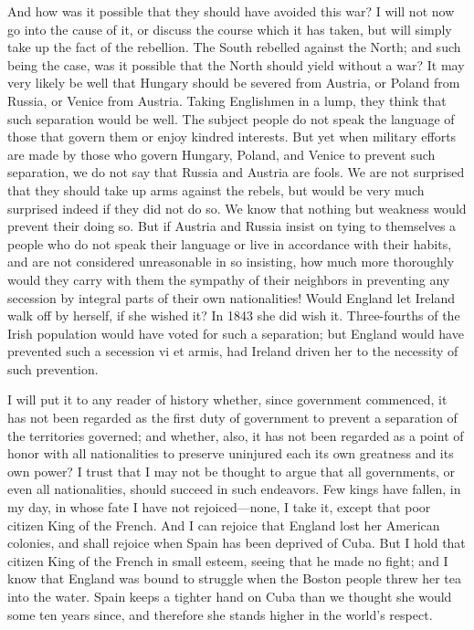 And how was it possible that they should have avoided this war?  I
will not now go into the cause of it, or discuss the course which
it has taken, but will simply take up the fact of the rebellion.
The South rebelled against the North; and such being the case, was
it possible that the North should yield without a war?  It may very
likely be well that Hungary should be severed from Austria, or
Poland from Russia, or Venice from Austria.  Taking Englishmen in a
lump, they think that such separation would be well.  The subject
people do not speak the language of those that govern them or enjoy
kindred interests.  But yet when military efforts are made by those
who govern Hungary, Poland, and Venice to prevent such separation,
we do not say that Russia and Austria are fools.  We are not
surprised that they should take up arms against the rebels, but
would be very much surprised indeed if they did not do so.  We know
that nothing but weakness would prevent their doing so.  But if
Austria and Russia insist on tying to themselves a people who do
not speak their language or live in accordance with their habits,
and are not considered unreasonable in so insisting, how much more
thoroughly would they carry with them the sympathy of their
neighbors in preventing any secession by integral parts of their
own nationalities!  Would England let Ireland walk off by herself,
if she wished it?  In 1843 she did wish it.  Three-fourths of the
Irish population would have voted for such a separation; but
England would have prevented such a secession vi et armis, had
Ireland driven her to the necessity of such prevention.

I will put it to any reader of history whether, since government
commenced, it has not been regarded as the first duty of government
to prevent a separation of the territories governed; and whether,
also, it has not been regarded as a point of honor with all
nationalities to preserve uninjured each its own greatness and its
own power?  I trust that I may not be thought to argue that all
governments, or even all nationalities, should succeed in such
endeavors.  Few kings have fallen, in my day, in whose fate I have
not rejoiced---none, I take it, except that poor citizen King of the
French.  And I can rejoice that England lost her American colonies,
and shall rejoice when Spain has been deprived of Cuba.  But I hold
that citizen King of the French in small esteem, seeing that he
made no fight; and I know that England was bound to struggle when
the Boston people threw her tea into the water.  Spain keeps a
tighter hand on Cuba than we thought she would some ten years
since, and therefore she stands higher in the world's respect.

